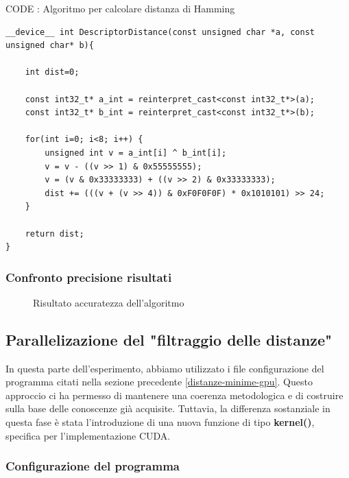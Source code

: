 \documentclass[12pt,a4paper]{report}
\begin{document}
\vspace{1cm}

CODE : Algoritmo per calcolare distanza di Hamming
\begin{lstlisting}
__device__ int DescriptorDistance(const unsigned char *a, const unsigned char* b){

    int dist=0;

    const int32_t* a_int = reinterpret_cast<const int32_t*>(a);
    const int32_t* b_int = reinterpret_cast<const int32_t*>(b);

    for(int i=0; i<8; i++) {
        unsigned int v = a_int[i] ^ b_int[i];
        v = v - ((v >> 1) & 0x55555555);
        v = (v & 0x33333333) + ((v >> 2) & 0x33333333);
        dist += (((v + (v >> 4)) & 0xF0F0F0F) * 0x1010101) >> 24;
    }

    return dist;
}
\end{lstlisting}


\subsubsection{Confronto precisione risultati}

\begin{figure}[h]
    \centering
    \caption{Risultato accuratezza dell'algoritmo}
\end{figure}

\subsection{Parallelizazione del "filtraggio delle distanze" }

In questa parte dell'esperimento, abbiamo utilizzato i file configurazione del programma citati nella sezione precedente \ref{distanze-minime-gpu}. Questo approccio ci ha permesso di mantenere una coerenza metodologica e di costruire sulla base delle conoscenze già acquisite. Tuttavia, la differenza sostanziale in questa fase è stata l'introduzione di una nuova funzione di tipo \textbf{kernel()}, specifica per l'implementazione CUDA.
\subsubsection{Configurazione del programma}
\end{document}
